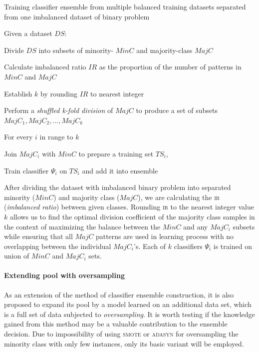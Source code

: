 \documentclass[pmlr]{jmlr}
\begin{document}
\begin{algorithm}[!h]
\caption{Training classifier ensemble from multiple balanced training datasets separated from one imbalanced dataset of binary problem}\label{alg:moore}
Given a dataset $DS$:
\begin{enumerate*}
	\item Divide $DS$ into subsets of minority- $MinC$ and majority-class $MajC$
	\item Calculate imbalanced ratio $IR$ as the proportion of the number of patterns in $MinC$ and $MajC$ 
	\item Establish $k$ by rounding $IR$ to nearest integer
	\item Perform a \emph{shuffled k-fold division} of $MajC$ to produce a set of subsets $MajC_1, MajC_2, \ldots, MajC_k$ 
	\item For every $i$ in range to $k$
	\begin{enumerate*}
		\item Join $MajC_i$ with $MinC$ to prepare a training set $TS_i$,
		\item Train classifier $\Psi_i$ on $TS_i$ and add it into ensemble
	\end{enumerate*}
\end{enumerate*}
\end{algorithm}

After dividing the dataset with imbalanced binary problem into separated minority ($MinC$) and majority class ($MajC$), we are calculating the \textsc{ir} (\emph{imbalanced ratio}) between given classes. Rounding \textsc{ir} to the nearest integer value $k$ allows us to find the optimal division coefficient of the majority class samples in the context of maximizing the balance between the $MinC$ and any $MajC_i$ subsets while ensuring that all $MajC$ patterns are used in learning process with no overlapping between the individual $MajC_i$'s. Each of $k$ classifiers $\Psi_i$ is trained on union of $MinC$ and $MajC_i$ sets.

\paragraph{Extending pool with oversampling} As an extension of the method of classifier ensemble construction, it is also proposed to expand its pool by a model learned on an additional data set, which is a full set of data subjected to \emph{oversampling}. It is worth testing if the knowledge gained from this method may be a valuable contribution to the ensemble decision. Due to impossibility of using \textsc{smote} or \textsc{adasyn} for oversampling the minority class with only few instances, only its basic variant will be employed. 
\end{document}
